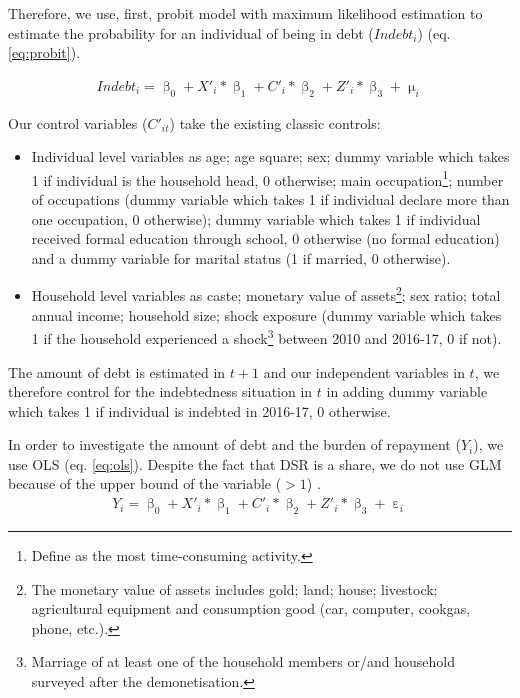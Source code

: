 \documentclass[a4paper, 11pt, onecolumn]{article}
\begin{document}
Therefore, we use, first, probit model with maximum likelihood estimation to estimate the probability for an individual of being in debt ($Indebt_{i}$) (eq. \ref{eq:probit}).

\begin{equation}\label{eq:probit}
\begin{split}
Indebt_{i}=\upbeta_{0}+X'_{i}*\upbeta_{1}+C'_{i}*\upbeta_{2}+Z'_{i}*\upbeta_{3}+\upmu_{i}
\end{split}
\end{equation}

Our control variables ($C'_{it}$) take the existing classic controls:
\begin{itemize}
\item Individual level variables as age; age square; sex; dummy variable which takes 1 if individual is the household head, 0 otherwise; main occupation\footnote{Define as the most time-consuming activity.}; number of occupations (dummy variable which takes 1 if individual declare more than one occupation, 0 otherwise); dummy variable which takes 1 if individual received formal education through school, 0 otherwise (no formal education) and a dummy variable for marital status (1 if married, 0 otherwise). 
\item Household level variables as caste; monetary value of assets\footnote{The monetary value of assets includes gold; land; house; livestock; agricultural equipment and consumption good (car, computer, cookgas, phone, etc.).}; sex ratio; total annual income; household size; shock exposure (dummy variable which takes 1 if the household experienced a shock\footnote{Marriage of at least one of the household members or/and household surveyed after the demonetisation.} between 2010 and 2016-17, 0 if not). 
\end{itemize}
The amount of debt is estimated in $t+1$ and our independent variables in $t$, we therefore control for the indebtedness situation in $t$ in adding dummy variable which takes 1 if individual is indebted in 2016-17, 0 otherwise.

In order to investigate the amount of debt and the burden of repayment ($Y_{i}$), we use OLS (eq. \ref{eq:ols}).
Despite the fact that DSR is a share, we do not use GLM because of the upper bound of the variable ($>1$) \citep{Cook2008}.
\begin{equation}\label{eq:ols}
\begin{split}
Y_{i}=\upbeta_{0}+X'_{i}*\upbeta_{1}+C'_{i}*\upbeta_{2}+Z'_{i}*\upbeta_{3}+\upepsilon_i
\end{split}
\end{equation}
\end{document}
